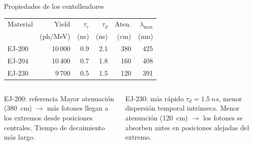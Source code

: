 \documentclass[aspectratio=169,9pt]{beamer}
\begin{document}
\begin{frame}{Propiedades de los centelleadores}
  \centering
  \begin{tabular}{lrrrrr}
    \toprule
    Material & Yield        & $\tau_r$ & $\tau_d$ & Aten. & $\lambda_{\max}$ \\
             & (ph/MeV)     & (ns)     & (ns)     & (cm)  & (nm) \\
    \midrule
    EJ-200   & 10\,000      & 0.9      & 2.1      & 380   & 425  \\
    EJ-204   & 10\,400      & 0.7      & 1.8      & 160   & 408  \\
    EJ-230   & \phantom{0}9\,700 & 0.5 & 1.5     & 120   & 391  \\
    \bottomrule
  \end{tabular}

  \vspace{0.5cm}
  \begin{columns}[T]
    \begin{block}{EJ-200: referencia}
      Mayor atenuación (\SI{380}{cm}) $\to$ más fotones llegan a los extremos
      desde posiciones centrales. Tiempo de decaimiento más largo.
    \end{block}
    \begin{block}{EJ-230: más rápido}
      $\tau_d = \SI{1.5}{ns}$, menor dispersión temporal intrínseca.
      Menor atenuación (\SI{120}{cm}) $\to$ los fotones se absorben antes
      en posiciones alejadas del extremo.
    \end{block}
  \end{columns}
\end{frame}
\end{document}
